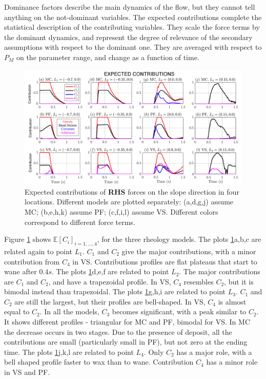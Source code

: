\documentclass{article}
\begin{document}
Dominance factors describe the main dynamics of the flow, but they cannot tell anything on the not-dominant variables. The expected contributions complete the statistical description of the contributing variables. They scale the force terms by the dominant dynamics, and represent the degree of relevance of the secondary assumptions with respect to the dominant one. They are averaged with respect to $P_M$ on the parameter range, and change as a function of time.
\begin{figure}[H]
         \centering
        \includegraphics[width=1\textwidth]{figures/incline/Ci_x.png}
        \caption{Expected contributions of \textbf{RHS} forces on the slope direction in four locations. Different models are plotted separately: (a,d,g,j) assume MC; (b,e,h,k) assume PF; (c,f,i,l) assume VS. Different colors correspond to different force terms.}
        \label{fig:Ramp-Ci_x}
\end{figure}
Figure \ref{fig:Ramp-Ci_x} shows $\mathbb E[C_i]_{i=1,\dots,4}$, for the three rheology models. The plots \ref{fig:Ramp-Ci_x}a,b,c are related again to point $L_1$. $C_1$ and $C_2$ give the major contributions, with a minor contribution from $C_4$ in VS. Contributions profiles are flat plateaus that start to wane after $0.4 s$. The plots \ref{fig:Ramp-Ci_x}d,e,f are related to point $L_2$. The major contributions are $C_1$ and $C_2$, and have a trapezoidal profile. In VS, $C_4$ resembles $C_2$, but it is bimodal instead than trapezoidal. The plots \ref{fig:Ramp-Ci_x}g,h,i are related to point $L_3$. $C_1$ and $C_2$ are still the largest, but their profiles are bell-shaped. In VS, $C_4$ is almost equal to $C_2$. In all the models, $C_3$ becomes significant, with a peak similar to $C_2$. It shows different profiles - triangular for MC and PF, bimodal for VS. In MC the decrease occurs in two stages. Due to the presence of deposit, all the contributions are small (particularly small in PF), but not zero at the ending time. The plots \ref{fig:Ramp-Ci_x}j,k,l are related to point $L_4$. Only $C_2$ has a major role, with a bell shaped profile faster to wax than to wane. Contribution $C_4$ has a minor role in VS and PF.
\newpage
\end{document}
